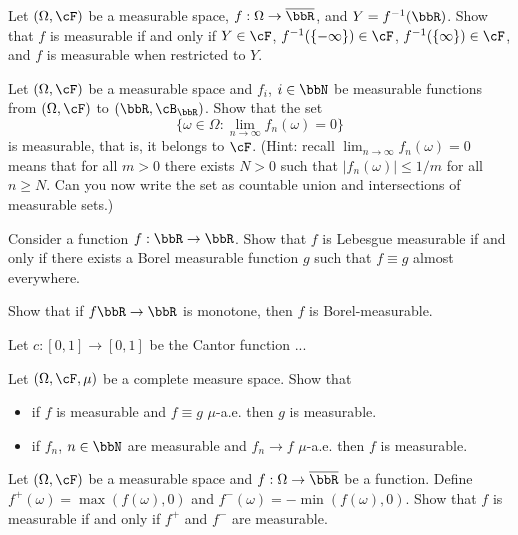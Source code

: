 \begin{problem}
    Let $(\Omega,\cF)$ be a measurable space, $f:\Omega\to \overline{\bbR}$, and $Y = f^{-1}(\bbR)$. Show that $f$ is measurable if and only if $Y\in \cF$, $f^{-1}(\{-\infty\})\in\cF$, $f^{-1}(\{\infty\})\in \cF$, and $f$ is measurable when restricted to $Y$.  
\end{problem}

\begin{problem}
    Let $(\Omega,\cF)$ be a measurable space and $f_i$, $i\in \bbN$ be measurable functions from $(\Omega,\cF)$ to $(\bbR,\cB_\bbR)$. Show that the set 
    \begin{equation*}
        \{\omega\in \Omega: \lim_{n\to \infty} f_n(\omega) = 0\}
    \end{equation*}
    is measurable, that is, it belongs to $\cF$.
    (Hint: recall $\lim_{n\to \infty} f_n(\omega) = 0$ means that for all $m>0$ there exists $N>0$ such that $|f_n(\omega)|\leq 1/m$ for all $n\geq N$. Can you now write the set as countable union and intersections of measurable sets.)
\end{problem}

\begin{problem} Consider a function $f:\bbR\to \bbR$. Show that $f$ is Lebesgue measurable if and only if there exists a Borel measurable function $g$ such that $f\equiv g$ almost everywhere.
\end{problem}

\begin{problem} Show that if $f\bbR\to\bbR$ is monotone, then $f$ is Borel-measurable.
\end{problem}

\begin{problem} Let $c:[0,1]\to [0,1]$ be the Cantor function ...
    
\end{problem}

\begin{problem} Let $(\Omega,\cF,\mu)$ be a complete measure space. Show that 
\begin{itemize}
    \item if $f$ is measurable and $f\equiv g$ $\mu$-a.e. then $g$ is measurable.
    \item if $f_n$, $n\in \bbN$ are measurable and $f_n\to f$ $\mu$-a.e. then $f$ is measurable.
\end{itemize}
\end{problem}

\begin{problem}
    Let $(\Omega,\cF)$ be a measurable space and $f:\Omega\to\overline{\bbR}$ be a function. 
    Define $f^+(\omega) = \max(f(\omega),0)$ and  $f^-(\omega) = -\min(f(\omega),0)$.
    Show that $f$ is measurable if and only if $f^+$ and $f^{-}$ are measurable.
\end{problem}